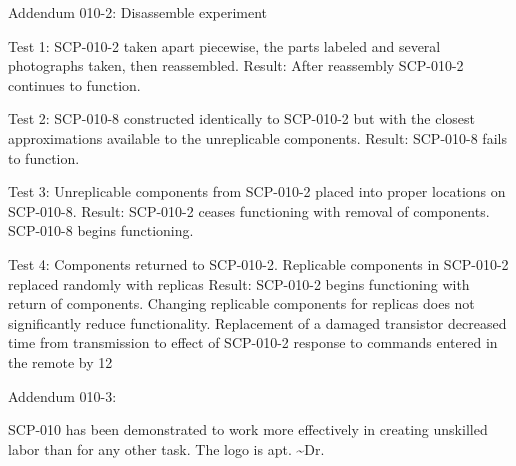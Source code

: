 Addendum 010-2: Disassemble experiment

Test 1: SCP-010-2 taken apart piecewise, the parts labeled and several photographs taken, then reassembled.
Result: After reassembly SCP-010-2 continues to function.

Test 2: SCP-010-8 constructed identically to SCP-010-2 but with the closest approximations available to the unreplicable components.
Result: SCP-010-8 fails to function.

Test 3: Unreplicable components from SCP-010-2 placed into proper locations on SCP-010-8.
Result: SCP-010-2 ceases functioning with removal of components. SCP-010-8 begins functioning.

Test 4: Components returned to SCP-010-2. Replicable components in SCP-010-2 replaced randomly with replicas
Result: SCP-010-2 begins functioning with return of components. Changing replicable components for replicas does not significantly reduce functionality. Replacement of a damaged transistor decreased time from transmission to effect of SCP-010-2 response to commands entered in the remote by 12%

Addendum 010-3:

SCP-010 has been demonstrated to work more effectively in creating unskilled labor than for any other task. The logo is apt. \textasciitilde Dr. 